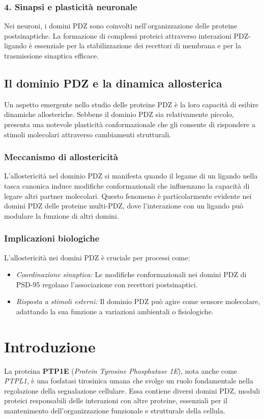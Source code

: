 \documentclass[Lau,binding=0.6cm,oneside,noexaminfo]{sapthesis}
\begin{document}
\subsubsection*{4. Sinapsi e plasticità neuronale}
Nei neuroni, i domini PDZ sono coinvolti nell’organizzazione delle proteine postsinaptiche. La formazione di complessi proteici attraverso interazioni PDZ-ligando è essenziale per la stabilizzazione dei recettori di membrana e per la trasmissione sinaptica efficace.

\subsection*{Il dominio PDZ e la dinamica allosterica}

Un aspetto emergente nello studio delle proteine PDZ è la loro capacità di esibire dinamiche allosteriche. Sebbene il dominio PDZ sia relativamente piccolo, presenta una notevole plasticità conformazionale che gli consente di rispondere a stimoli molecolari attraverso cambiamenti strutturali.

\subsubsection*{Meccanismo di allostericità}
L’allostericità nel dominio PDZ si manifesta quando il legame di un ligando nella tasca canonica induce modifiche conformazionali che influenzano la capacità di legare altri partner molecolari. Questo fenomeno è particolarmente evidente nei domini PDZ delle proteine multi-PDZ, dove l’interazione con un ligando può modulare la funzione di altri domini.

\subsubsection*{Implicazioni biologiche}
L’allostericità nei domini PDZ è cruciale per processi come:
\begin{itemize}
    \item \emph{Coordinazione sinaptica:} Le modifiche conformazionali nei domini PDZ di PSD-95 regolano l’associazione con recettori postsinaptici.
    \item \emph{Risposta a stimoli esterni:} Il dominio PDZ può agire come sensore molecolare, adattando la sua funzione a variazioni ambientali o fisiologiche.
\end{itemize}\section{Introduzione}
La proteina \textbf{PTP1E} (\textit{Protein Tyrosine Phosphatase 1E}), nota anche come \textit{PTPL1}, è una fosfatasi tirosinica umana che svolge un ruolo fondamentale nella regolazione della segnalazione cellulare. Essa contiene diversi domini PDZ, moduli proteici responsabili delle interazioni con altre proteine, essenziali per il mantenimento dell'organizzazione funzionale e strutturale della cellula. 
\end{document}
